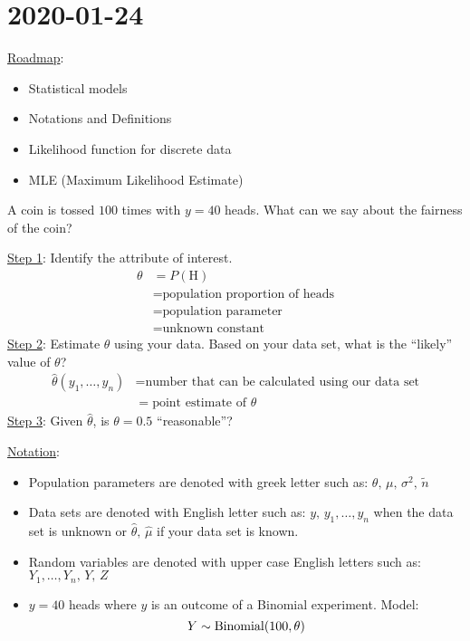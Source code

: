 \section{2020-01-24}
\underline{Roadmap}:
\begin{itemize}
    \item Statistical models
    \item Notations and Definitions
    \item Likelihood function for discrete data
    \item MLE (Maximum Likelihood Estimate)
\end{itemize}

A coin is tossed $ 100 $ times with $ y=40 $ heads. What can we say
about the fairness of the coin?

\underline{Step 1}: Identify the attribute of interest.
\begin{align*}
    \theta & =P(\text{H})                           \\
           & =\text{population proportion of heads} \\
           & =\text{population parameter}           \\
           & =\text{unknown constant}
\end{align*}
\underline{Step 2}: Estimate $ \theta $ using your data. Based on your data
set, what is the ``likely'' value of $ \theta $?
\begin{align*}
    \hat{\theta}(y_1,\ldots ,y_n) & =
    \text{number that can be calculated using our data set}           \\
                                  & =\text{point estimate of } \theta
\end{align*}
\underline{Step 3}: Given $ \hat{\theta} $, is $ \theta=0.5 $ ``reasonable''?

\underline{Notation}:
\begin{itemize}
    \item Population parameters are denoted with greek letter such as:
          $ \theta,\,\mu,\,\sigma^2,\,\tilde{n} $
    \item Data sets are denoted with English letter such as:
          $ y,\,y_1,\ldots ,y_n $ when the data set is unknown or
          $ \hat{\theta},\,\hat{\mu} $ if your data set is known.
    \item Random variables are denoted with upper case English letters such as:
          $ Y_1,\ldots ,Y_n,\,Y,\,Z $
    \item $ y=40 $ heads where $ y $ is an outcome of a Binomial experiment. Model:
          \[ Y \sim \operatorname{Binomial}(100,\theta) \]
\end{itemize}

